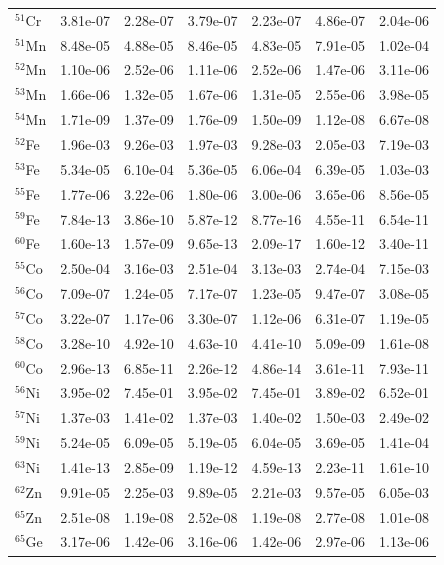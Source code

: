 \begin{table}
\begin{tabular}{l|cc|cc|cc}
$^{51}$Cr & 3.81e-07 & 2.28e-07 & 3.79e-07 & 2.23e-07 & 4.86e-07 & 2.04e-06\\
$^{51}$Mn & 8.48e-05 & 4.88e-05 & 8.46e-05 & 4.83e-05 & 7.91e-05 & 1.02e-04\\
$^{52}$Mn & 1.10e-06 & 2.52e-06 & 1.11e-06 & 2.52e-06 & 1.47e-06 & 3.11e-06\\
$^{53}$Mn & 1.66e-06 & 1.32e-05 & 1.67e-06 & 1.31e-05 & 2.55e-06 & 3.98e-05\\
$^{54}$Mn & 1.71e-09 & 1.37e-09 & 1.76e-09 & 1.50e-09 & 1.12e-08 & 6.67e-08\\
$^{52}$Fe & 1.96e-03 & 9.26e-03 & 1.97e-03 & 9.28e-03 & 2.05e-03 & 7.19e-03\\
$^{53}$Fe & 5.34e-05 & 6.10e-04 & 5.36e-05 & 6.06e-04 & 6.39e-05 & 1.03e-03\\
$^{55}$Fe & 1.77e-06 & 3.22e-06 & 1.80e-06 & 3.00e-06 & 3.65e-06 & 8.56e-05\\
$^{59}$Fe & 7.84e-13 & 3.86e-10 & 5.87e-12 & 8.77e-16 & 4.55e-11 & 6.54e-11\\
$^{60}$Fe & 1.60e-13 & 1.57e-09 & 9.65e-13 & 2.09e-17 & 1.60e-12 & 3.40e-11\\
$^{55}$Co & 2.50e-04 & 3.16e-03 & 2.51e-04 & 3.13e-03 & 2.74e-04 & 7.15e-03\\
$^{56}$Co & 7.09e-07 & 1.24e-05 & 7.17e-07 & 1.23e-05 & 9.47e-07 & 3.08e-05\\
$^{57}$Co & 3.22e-07 & 1.17e-06 & 3.30e-07 & 1.12e-06 & 6.31e-07 & 1.19e-05\\
$^{58}$Co & 3.28e-10 & 4.92e-10 & 4.63e-10 & 4.41e-10 & 5.09e-09 & 1.61e-08\\
$^{60}$Co & 2.96e-13 & 6.85e-11 & 2.26e-12 & 4.86e-14 & 3.61e-11 & 7.93e-11\\
$^{56}$Ni & 3.95e-02 & 7.45e-01 & 3.95e-02 & 7.45e-01 & 3.89e-02 & 6.52e-01\\
$^{57}$Ni & 1.37e-03 & 1.41e-02 & 1.37e-03 & 1.40e-02 & 1.50e-03 & 2.49e-02\\
$^{59}$Ni & 5.24e-05 & 6.09e-05 & 5.19e-05 & 6.04e-05 & 3.69e-05 & 1.41e-04\\
$^{63}$Ni & 1.41e-13 & 2.85e-09 & 1.19e-12 & 4.59e-13 & 2.23e-11 & 1.61e-10\\
$^{62}$Zn & 9.91e-05 & 2.25e-03 & 9.89e-05 & 2.21e-03 & 9.57e-05 & 6.05e-03\\
$^{65}$Zn & 2.51e-08 & 1.19e-08 & 2.52e-08 & 1.19e-08 & 2.77e-08 & 1.01e-08\\
$^{65}$Ge & 3.17e-06 & 1.42e-06 & 3.16e-06 & 1.42e-06 & 2.97e-06 & 1.13e-06\\
\hline
\end{tabular}
\end{table}
